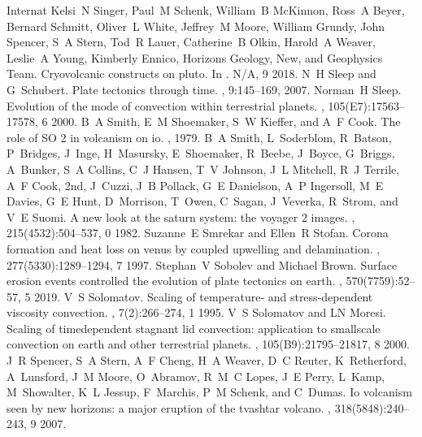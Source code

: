\documentclass[letterpaper,10pt,english]{jupyterBook}
\begin{document}
\begin{sphinxthebibliography}{Internat}
\sphinxAtStartPar
Kelsi N Singer, Paul M Schenk, William B McKinnon, Ross A Beyer, Bernard Schmitt, Oliver L White, Jeffrey M Moore, William Grundy, John Spencer, S A Stern, Tod R Lauer, Catherine B Olkin, Harold A Weaver, Leslie A Young, Kimberly Ennico, Horizons Geology, New, and Geophysics Team. Cryovolcanic constructs on pluto. In . N/A, 9 2018.
\sphinxAtStartPar
N H Sleep and G Schubert. Plate tectonics through time. , 9:145–169, 2007.
\sphinxAtStartPar
Norman H Sleep. Evolution of the mode of convection within terrestrial planets. , 105(E7):17563–17578, 6 2000.
\sphinxAtStartPar
B A Smith, E M Shoemaker, S W Kieffer, and A F Cook. The role of SO 2 in volcanism on io. , 1979.
\sphinxAtStartPar
B A Smith, L Soderblom, R Batson, P Bridges, J Inge, H Masursky, E Shoemaker, R Beebe, J Boyce, G Briggs, A Bunker, S A Collins, C J Hansen, T V Johnson, J L Mitchell, R J Terrile, A F Cook, 2nd, J Cuzzi, J B Pollack, G E Danielson, A P Ingersoll, M E Davies, G E Hunt, D Morrison, T Owen, C Sagan, J Veverka, R Strom, and V E Suomi. A new look at the saturn system: the voyager 2 images. , 215(4532):504–537, 0 1982.
\sphinxAtStartPar
Suzanne E Smrekar and Ellen R Stofan. Corona formation and heat loss on venus by coupled upwelling and delamination. , 277(5330):1289–1294, 7 1997.
\sphinxAtStartPar
Stephan V Sobolev and Michael Brown. Surface erosion events controlled the evolution of plate tectonics on earth. , 570(7759):52–57, 5 2019.
\sphinxAtStartPar
V S Solomatov. Scaling of temperature‐ and stress‐dependent viscosity convection. , 7(2):266–274, 1 1995.
\sphinxAtStartPar
V S Solomatov and L\sphinxhyphen{}N Moresi. Scaling of time\sphinxhyphen{}dependent stagnant lid convection: application to small\sphinxhyphen{}scale convection on earth and other terrestrial planets. , 105(B9):21795–21817, 8 2000.
\sphinxAtStartPar
J R Spencer, S A Stern, A F Cheng, H A Weaver, D C Reuter, K Retherford, A Lunsford, J M Moore, O Abramov, R M C Lopes, J E Perry, L Kamp, M Showalter, K L Jessup, F Marchis, P M Schenk, and C Dumas. Io volcanism seen by new horizons: a major eruption of the tvashtar volcano. , 318(5848):240–243, 9 2007.

\end{sphinxthebibliography}
\end{document}
